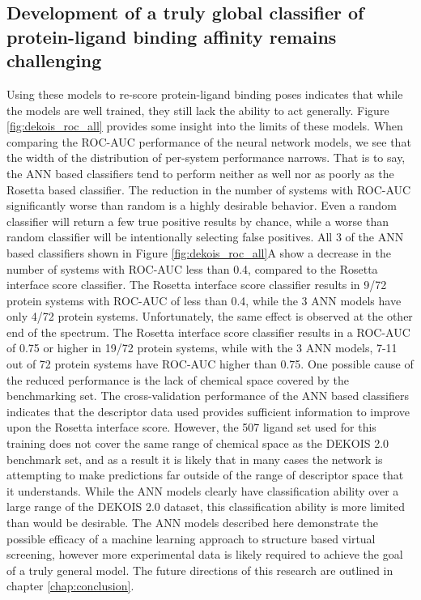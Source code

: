 \subsection{Development of a truly global classifier of protein-ligand binding affinity remains challenging}

Using these models to re-score protein-ligand binding poses indicates that while the models are well trained, they still lack the ability to act generally. Figure \ref{fig:dekois_roc_all} provides some insight into the limits of these models.
When comparing the \ac{ROC-AUC} performance of the neural network models, we see that the width of the distribution of per-system performance narrows.
That is to say, the \ac{ANN} based classifiers tend to perform neither as well nor as poorly as the Rosetta based classifier.
The reduction in the number of systems with \ac{ROC-AUC} significantly worse than random is a highly desirable behavior.
Even a random classifier will return a few true positive results by chance, while a worse than random classifier will be intentionally selecting false positives.
All 3 of the \ac{ANN} based classifiers shown in Figure \ref{fig:dekois_roc_all}A show a decrease in the number of systems with \ac{ROC-AUC} less than 0.4, compared to the Rosetta interface score classifier.
The Rosetta interface score classifier results in 9/72 protein systems with \ac{ROC-AUC} of less than 0.4, while the 3 \ac{ANN} models have only 4/72 protein systems.
Unfortunately, the same effect is observed at the other end of the spectrum.
The Rosetta interface score classifier results in a \ac{ROC-AUC} of 0.75 or higher in 19/72 protein systems, while with the 3 \ac{ANN} models, 7-11 out of 72 protein systems have \ac{ROC-AUC} higher than 0.75. 
One possible cause of the reduced performance is the lack of chemical space covered by the benchmarking set.
The cross-validation performance of the \ac{ANN} based classifiers indicates that the descriptor data used provides sufficient information to improve upon the Rosetta interface score.
However, the 507 ligand set used for this training does not cover the same range of chemical space as the DEKOIS 2.0 benchmark set, and as a result it is likely that in many cases the network is attempting to make predictions far outside of the range of descriptor space that it understands.
While the \ac{ANN} models clearly have classification ability over a large range of the DEKOIS 2.0 dataset, this classification ability is more limited than would be desirable.
The \ac{ANN} models described here demonstrate the possible efficacy of a machine learning approach to structure based virtual screening, however more experimental data is likely required to achieve the goal of a truly general model.
The future directions of this research are outlined in chapter \ref{chap:conclusion}.